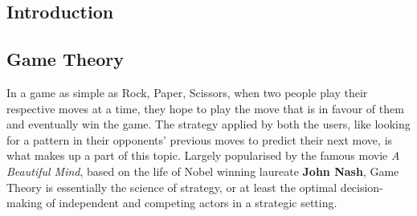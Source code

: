 \begin{flushleft}
\section{Introduction}
\end{flushleft}
\subsection{Game Theory}
In a game as simple as Rock, Paper, Scissors, when two people play their respective moves at a time, they hope to play the move that is in favour of them and eventually win the game. The strategy applied by both the users, like looking for a pattern in their opponents' previous moves to predict their next move, is what makes up a part of this topic. Largely popularised by the famous movie \textit{A Beautiful Mind}, based on the life of Nobel winning laureate \textbf{John Nash}, Game Theory is essentially the science of strategy, or at least the optimal decision-making of independent and competing actors in a strategic setting.
